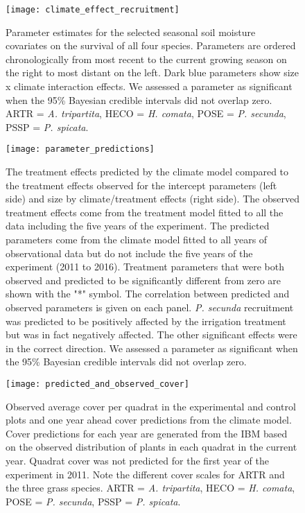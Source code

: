 \documentclass[11pt]{article}
\begin{document}
\begin{figure}[!htbp]
	\centering
	\texttt{[image: climate\_effect\_recruitment]}
	\caption{Parameter estimates for the selected seasonal soil moisture covariates on the survival of all four species. Parameters are ordered chronologically from most recent to the current growing season on the right to most distant on the left. Dark blue parameters show size x climate interaction effects. We assessed a parameter as significant when the 95\% Bayesian credible intervals did not overlap zero.  ARTR = \textit{A. tripartita}, HECO = \textit{H. comata}, POSE = \textit{P. secunda}, PSSP = \textit{P. spicata}. }
	\label{fig:climateRecruitment}
\end{figure}

\begin{figure}[!htbp]
	\centering
	\texttt{[image: parameter\_predictions]}
	\caption{The treatment effects predicted by the climate model compared to the treatment effects observed for the intercept parameters (left side) and size by climate/treatment effects (right side).  The observed treatment effects come from the treatment model fitted to all the data including the five years of the experiment.  The predicted parameters come from the climate model fitted to all years of observational data but do not include the five years of the experiment (2011 to 2016).  Treatment parameters that were both observed and predicted to be significantly different from zero are shown with the "*" symbol. The correlation between predicted and observed parameters is given on each panel. \textit{P. secunda} recruitment was predicted to be positively affected by the irrigation treatment but was in fact negatively affected. The other significant effects were in the correct direction. We assessed a parameter as significant when the 95\% Bayesian credible intervals did not overlap zero.}
	\label{fig:parPredictions}
\end{figure}

\begin{figure}[!htbp]
	\centering
	\texttt{[image: predicted\_and\_observed\_cover]}
	\caption{Observed average cover per quadrat in the experimental and control plots and one year ahead cover predictions from the climate model. Cover predictions for each year are generated from the IBM based on the observed distribution of plants in each quadrat in the current year. Quadrat cover was not predicted for the first year of the experiment in 2011.  Note the different cover scales for ARTR and the three grass species. ARTR = \textit{A. tripartita}, HECO = \textit{H. comata}, POSE = \textit{P. secunda}, PSSP = \textit{P. spicata}.}
	\label{fig:coverPred}
\end{figure}
\end{document}
